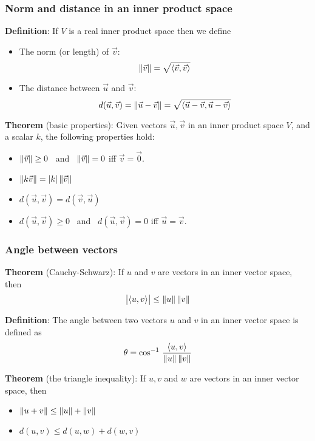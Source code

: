  \begin{frame}[fragile]\frametitle{Norm and distance in an inner product space}

\textbf{Definition}: If $V$ is a real inner product space then we define

\begin{itemize}

\item The norm (or length) of $\vec{v}$:
$$\lVert\vec{v}\rVert = \sqrt{ \left<  \vec{v}, \vec{v}  \right> } $$

\item The distance between $\vec{u}$ and $\vec{v}$:
$$ d (\vec{u}, \vec{v}) = \lVert \vec{u} - \vec{v}\rVert =  \sqrt{ \left<  \vec{u} - \vec{v}, \vec{u} - \vec{v}  \right> } $$

\end{itemize}



\textbf{Theorem} (basic properties): Given vectors $\vec{u}, \vec{v}$ in an inner product space $V$, and a scalar $k$, the following properties hold:

\begin{itemize}

\item $\lVert\vec{v}\rVert \ge 0$ \ and \ $\lVert\vec{v}\rVert = 0$ iff $\vec{v} = \vec{0}$.

\item $\lVert k \vec{v}\rVert = |k| \, \lVert\vec{v}\rVert$

\item $d (\vec{u}, \vec{v}) = d (\vec{v}, \vec{u}) $

\item $d (\vec{u}, \vec{v} ) \ge 0$ \ and \ $d (\vec{u}, \vec{v}) = 0$ iff $\vec{u} = \vec{v}$.


\end{itemize}

\end{frame}


 \begin{frame}[fragile]\frametitle{Angle between vectors}

\textbf{Theorem} (Cauchy-Schwarz): If $u$ and $v$ are vectors in an inner vector space, then
$$\bigl|  \left< u, v \right>  \bigr| \le \lVert u\rVert \, \lVert v\rVert $$




\textbf{Definition}: The angle between two vectors  $u$ and $v$ in an inner vector space is defined as
$$\theta = \cos^{-1} \, \frac{\left< u,v \right>}{\lVert u\rVert \, \lVert v\rVert}  $$





\textbf{Theorem} (the triangle inequality):  If $u, v$ and $w$ are vectors in an inner vector space, then
\begin{itemize}
\item $\lVert u + v\rVert \le \lVert u\rVert + \lVert v\rVert$

\item $d (u, v) \le d (u, w) + d (w, v)$
\end{itemize}

\end{frame}


